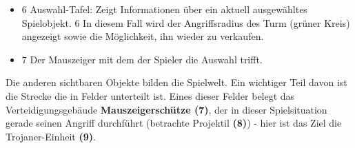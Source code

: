 \begin{itemize}[leftmargin=*]
	\item {$6$ Auswahl-Tafel: Zeigt Informationen über ein aktuell ausgewähltes Spielobjekt.} \(6\) In diesem Fall wird der Angriffsradius des Turm (grüner Kreis) angezeigt sowie die Möglichkeit, ihn wieder zu verkaufen.
	\item {$7$ Der Mauszeiger mit dem der Spieler die Auswahl trifft.}
\end{itemize}
Die anderen sichtbaren Objekte bilden die Spielwelt. Ein wichtiger Teil davon ist die Strecke die in Felder unterteilt ist. Eines dieser Felder belegt das Verteidigungsgebäude \textbf{Mauszeigerschütze (7)}, der in dieser Spielsituation gerade seinen Angriff durchführt (betrachte Projektil \textbf{(8)}) - hier ist das Ziel die Trojaner-Einheit \textbf{(9)}.

